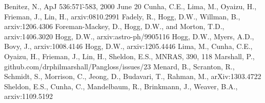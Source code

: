 \documentclass[12pt, onecolumn]{emulateapj}
\begin{document}


\begin{thebibliography}{}
Benitez, N., ApJ 536:571-̀583, 2000 June 20
Cunha, C.E., Lima, M., Oyaizu, H., Frieman, J., Lin, H., arxiv:0810.2991
Fadely, R., Hogg, D.W., Willman, B., arxiv:1206.4306
Foreman-Mackey, D., Hogg, D.W., and Morton, T.D., arxiv:1406.3020
Hogg, D.W., arxiv:astro-ph/9905116
Hogg, D.W., Myers, A.D., Bovy, J., arxiv:1008.4146
Hogg, D.W., arxiv:1205.4446
Lima, M., Cunha, C.E., Oyaizu, H., Frieman, J., Lin, H., Sheldon, E.S., MNRAS, 390, 118
Marshall, P., github.com/drphilmarshall/Pangloss/issues/23
Menard, B., Scranton, R., Schmidt, S., Morrison, C., Jeong, D., Budavari, T., Rahman, M., arXiv:1303.4722 
Sheldon, E.S., Cunha, C., Mandelbaum, R., Brinkmann, J., Weaver, B.A., arxiv:1109.5192

\end{thebibliography}
\end{document}
